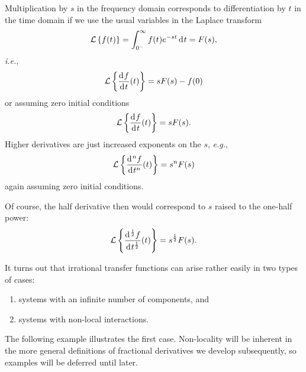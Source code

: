 Multiplication by $s$ in the frequency domain corresponds to differentiation by $t$ in the time domain if we use the
usual variables in the Laplace transform
\begin{equation}
  \mathcal{L} \left\{ f(t) \right\} = \int_{0^-}^\infty f(t) e^{-s t} \operatorname{d}\hspace*{-1pt} t = F(s),
\end{equation}
\textit{i.e.}, 
\begin{equation}
  \mathcal L \left\{ \frac{\operatorname{d}\hspace*{-1pt} f}{\operatorname{d}\hspace*{-1pt} t}(t) \right\} = s F(s) - f(0)
\end{equation}
or assuming zero initial conditions
\begin{equation}
  \mathcal L \left\{ \frac{\operatorname{d}\hspace*{-1pt} f}{\operatorname{d}\hspace*{-1pt} t}(t) \right\} = s F(s).
\end{equation}
Higher derivatives are just increased exponents on the $s$, \textit{e.g.}, 
\begin{equation}
  \mathcal L \left\{ \frac{\operatorname{d}\hspace*{-1pt}^n f}{\operatorname{d}\hspace*{-1pt} t^n}(t) \right\} = s^n F(s)
\end{equation}
again assuming zero initial conditions.

Of course, the half derivative then would correspond to $s$ raised to the one-half power:
\begin{equation}
  \mathcal L \left\{ \frac{\operatorname{d}\hspace*{-1pt}^\frac{1}{2} f}{\operatorname{d}\hspace*{-1pt} t^\frac{1}{2}}(t) \right\} = s^\frac{1}{2} F(s).
\end{equation}

It turns out that irrational transfer functions can arise rather easily in two types of cases:
\begin{enumerate}
  \item systems with an infinite number of components, and
  \item systems with non-local interactions.
\end{enumerate}
The following example illustrates the first case. Non-locality will be inherent in the more general definitions of fractional derivatives we develop subsequently, so examples will be deferred until later.

